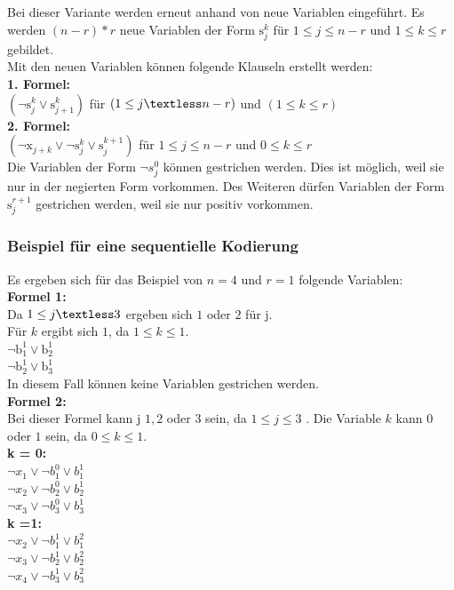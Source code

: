 \documentclass[a4,abstract=on]{scrartcl}
\begin{document}
Bei dieser Variante werden erneut anhand von \cite[][]{knuth} neue Variablen eingeführt. Es werden $(n-r)*r$ neue Variablen der Form $\text{s}_j^k$ für $1 \leq j \leq n - r$ und $1 \leq k \leq r$ gebildet. \\
Mit den neuen Variablen können folgende Klauseln erstellt werden:\\
\textbf{1. Formel:}\\
$(\neg \text{s}_j^k \vee \text{s}_{j+1}^k)$ für $(1 \leq j \textless n - r)$ und $(1 \leq k \leq r)$\\
\textbf{2. Formel:}\\
$(\neg \text{x}_{j+k} \vee \neg \text{s}_j^k \vee \text{s}_j^{k+1})$ für $1 \leq j \leq n - r$ und $0 \leq k \leq r$\\

Die Variablen der Form  $\neg s_j^0$ können gestrichen werden. Dies ist möglich, weil sie nur in der negierten Form vorkommen. Des Weiteren dürfen Variablen der Form $\text{s}_j^{r+1}$ gestrichen werden, weil sie nur positiv vorkommen.

	\subsubsection*{Beispiel für eine sequentielle Kodierung}
Es ergeben sich für das Beispiel von $n=4$ und $r=1$ folgende Variablen:\\
\textbf{Formel 1:}\\
Da $1 \leq j \textless 3$ ergeben sich $1$ oder $2$ für j.\\
Für $k$ ergibt sich $1$, da $1 \leq k \leq 1$.\\
$\neg \text{b}_1^1 \vee \text{b}_2^1$\\
$\neg  \text{b}_2^1 \vee \text{b}_3^1$\\
In diesem Fall können keine Variablen gestrichen werden.\\

\textbf{Formel 2:}\\
Bei dieser Formel kann j $1, 2$ oder $3$ sein, da $1 \leq j \leq 3$ . Die Variable $k$ kann $0$ oder $1$ sein, da $0 \leq k \leq 1$.\\
\textbf{k = 0:}\\
$\neg x_1 \vee \neg b_1^0 \vee b_1^1$\\
$\neg x_2 \vee \neg b_2^0 \vee b_2^1$\\
$\neg x_3 \vee \neg b_3^0 \vee b_3^1$\\
\textbf{k =1:}\\
$\neg x_2 \vee \neg b_1^1 \vee b_1^2$\\
$\neg x_3 \vee \neg b_2^1 \vee b_2^2$\\
$\neg x_4 \vee \neg b_3^1 \vee b_3^2$\\
\end{document}
